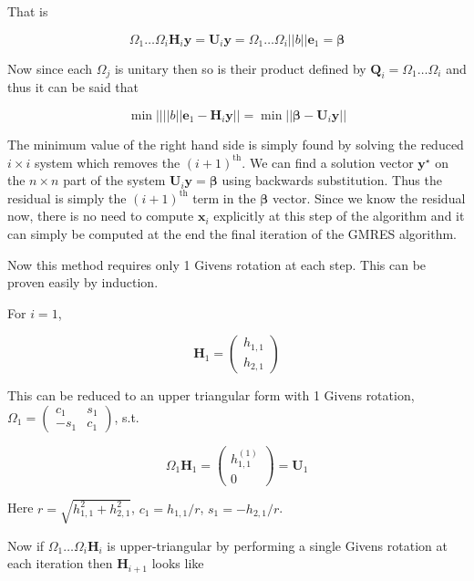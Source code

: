 \documentclass{article}
\begin{document}
\begin{enumerate}
\begin{enumerate}
		That is
		
		$$
		\Omega_1 \dots \Omega_i \boldsymbol{H}_i \boldsymbol{y} = \boldsymbol{U}_i \boldsymbol{y} = 
		\Omega_1 \dots \Omega_i ||b||\boldsymbol{e}_1 = \boldsymbol{\beta}
		$$
		
		Now since each $\Omega_j$ is unitary then so is their product defined by $\boldsymbol{Q}_i = \Omega_1 \dots \Omega_i$ and thus it can be said that 
		
		$$
		\min || ||b ||\boldsymbol{e}_1  -  \boldsymbol{H}_i \boldsymbol{y}  || = 
		\min || \boldsymbol{\beta} - \boldsymbol{U}_i \boldsymbol{y} || 
		$$	
		
		The minimum value of the right hand side is simply found by solving the reduced $i \times i$ system which removes the $(i+1)^{\text{th}}$. We can find a solution vector $\boldsymbol{y}^\star$ on the $n \times n$ part of the system $\boldsymbol{U}_i \boldsymbol{y} = \boldsymbol{\beta}$ using backwards substitution. Thus the residual is simply the $(i+1)^{\text{th}}$ term in the $\boldsymbol{\beta}$ vector. Since we know the residual now, there is no need to compute $\boldsymbol{x}_i$ explicitly at this step of the algorithm and it can simply be computed at the end the final iteration of the GMRES algorithm. 
		
		Now this method requires only 1 Givens rotation at each step. This can be proven easily by induction. 
		
		For $i=1$,
		
		$$
		\boldsymbol{H}_1 = \begin{pmatrix}
			h_{1,1}\\
			h_{2,1}
		\end{pmatrix}
		$$
		
		This can be reduced to an upper triangular form with 1 Givens rotation, $\Omega_1= \begin{pmatrix}
	    c_1  & s_1  \\
	    -s_1 & c_1 
		\end{pmatrix} $, s.t. 
		
		$$
		\Omega_1 \boldsymbol{H}_1 = 	\begin{pmatrix}
			h_{1,1}^{(1)}\\
			0
		\end{pmatrix} = \boldsymbol{U}_1 $$
		
		Here $r = \sqrt{ h_{1,1}^2 + h_{2, 1}^2}$, $c_1 = h_{1,1} / r$, $s_1 = - h_{ 2, 1} / r$. 
		
		Now if $\Omega_1 \dots \Omega_i \boldsymbol{H}_i$ is upper-triangular by performing a single Givens rotation at each iteration then $\boldsymbol{H}_{i+1}$ looks like
		

\end{enumerate}
\end{enumerate}
\end{document}
